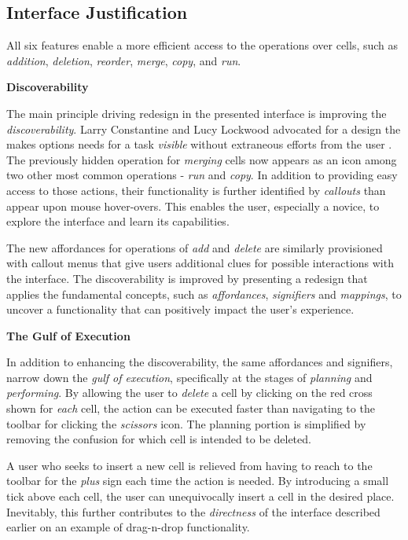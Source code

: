 \documentclass[12pt,letterpaper]{article}
\begin{document}
\subsection*{Interface Justification}
All six features enable a more efficient access to the operations over cells, such as \textit{addition}, \textit{deletion}, \textit{reorder}, \textit{merge}, \textit{copy}, and \textit{run}.

\textbf{Discoverability}

The main principle driving redesign in the presented interface is improving the \textit{discoverability}. Larry Constantine and Lucy Lockwood advocated for a design the makes options needs for a task \textit{visible} without extraneous efforts from the user \cite{jayasimman2011dynamic}. The previously hidden operation for \textit{merging} cells now appears as an icon among two other most common operations - \textit{run} and \textit{copy}. In addition to providing easy access to those actions, their functionality is further identified by \textit{callouts} than appear upon mouse hover-overs. This enables the user, especially a novice, to explore the interface and learn its capabilities. 

The new affordances for operations of \textit{add} and \textit{delete} are similarly provisioned with callout menus that give users additional clues for possible interactions with the interface. The discoverability is improved by presenting a redesign that applies the fundamental concepts, such as \textit{affordances}, \textit{signifiers} and \textit{mappings}, to uncover a functionality that can positively impact the user's experience. 

\textbf{The Gulf of Execution}

In addition to enhancing the discoverability, the same affordances and signifiers, narrow down the \textit{gulf of execution}, specifically at the stages of \textit{planning} and \textit{performing}. By allowing the user to \textit{delete} a cell by clicking on the red cross shown for \textit{each} cell, the action can be executed faster than navigating to the toolbar for clicking the \textit{scissors} icon. The planning portion is simplified by removing the confusion for which cell is intended to be deleted. 

A user who seeks to insert a new cell is relieved from having to reach to the toolbar for the \textit{plus} sign each time the action is needed. By introducing a small tick above each cell, the user can unequivocally insert a cell in the desired place. Inevitably, this further contributes to the \textit{directness} of the interface described earlier on an example of drag-n-drop functionality. 
\end{document}
